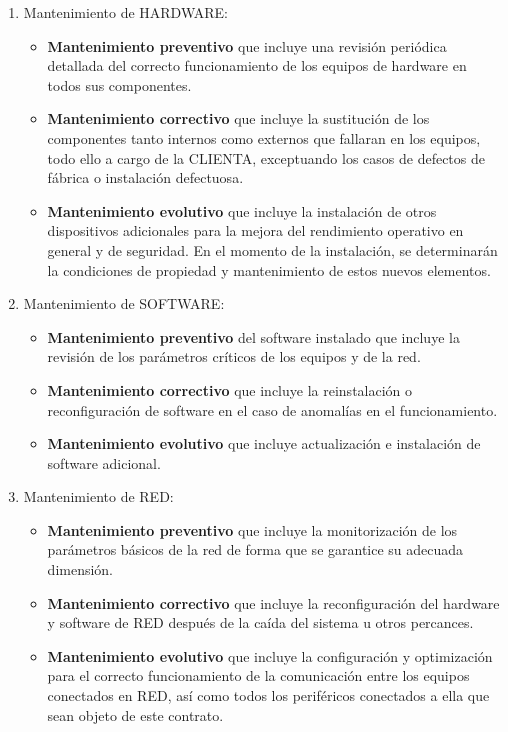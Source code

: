 \documentclass[11pt,spanish,a4paper,]{article}
\begin{document}
\begin{enumerate}
\def\labelenumi{\alph{enumi})}
\itemsep1pt\parskip0pt
\item
  Mantenimiento de HARDWARE:

  \begin{itemize}
  \itemsep1pt\parskip0pt
  \item
    \textbf{Mantenimiento preventivo} que incluye una revisión periódica
    detallada del correcto funcionamiento de los equipos de hardware en
    todos sus componentes.
  \item
    \textbf{Mantenimiento correctivo} que incluye la sustitución de los
    componentes tanto internos como externos que fallaran en los
    equipos, todo ello a cargo de la CLIENTA, exceptuando los casos de
    defectos de fábrica o instalación defectuosa.
  \item
    \textbf{Mantenimiento evolutivo} que incluye la instalación de otros
    dispositivos adicionales para la mejora del rendimiento operativo en
    general y de seguridad. En el momento de la instalación, se
    determinarán la condiciones de propiedad y mantenimiento de estos
    nuevos elementos.
  \end{itemize}
\item
  Mantenimiento de SOFTWARE:

  \begin{itemize}
  \itemsep1pt\parskip0pt
  \item
    \textbf{Mantenimiento preventivo} del software instalado que incluye
    la revisión de los parámetros críticos de los equipos y de la red.
  \item
    \textbf{Mantenimiento correctivo} que incluye la reinstalación o
    reconfiguración de software en el caso de anomalías en el
    funcionamiento.
  \item
    \textbf{Mantenimiento evolutivo} que incluye actualización e
    instalación de software adicional.
  \end{itemize}
\item
  Mantenimiento de RED:

  \begin{itemize}
  \itemsep1pt\parskip0pt
  \item
    \textbf{Mantenimiento preventivo} que incluye la monitorización de
    los parámetros básicos de la red de forma que se garantice su
    adecuada dimensión.
  \item
    \textbf{Mantenimiento correctivo} que incluye la reconfiguración del
    hardware y software de RED después de la caída del sistema u otros
    percances.
  \item
    \textbf{Mantenimiento evolutivo} que incluye la configuración y
    optimización para el correcto funcionamiento de la comunicación
    entre los equipos conectados en RED, así como todos los periféricos
    conectados a ella que sean objeto de este contrato.
  \end{itemize}
\end{enumerate}
\end{document}
